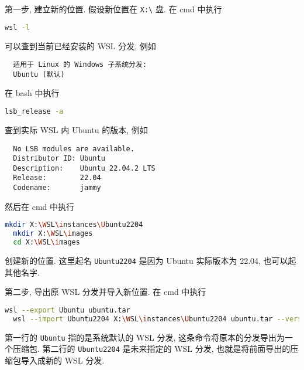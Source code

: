 \documentclass[fontset=founder]{ctexrep}
\begin{document}
第一步,
建立新的位置.
假设新位置在 \texttt{X:\textbackslash} 盘.
在 \textsf{cmd} 中执行
\begin{lstlisting}[language=bash]
  wsl -l
\end{lstlisting}
可以查到当前已经安装的 WSL 分发,
例如
\begin{lstlisting}
  适用于 Linux 的 Windows 子系统分发:
  Ubuntu (默认)
\end{lstlisting}
在 \textsf{bash} 中执行
\begin{lstlisting}[language=bash]
  lsb_release -a
\end{lstlisting}
查到实际 WSL 内 Ubuntu 的版本,
例如
\begin{lstlisting}
  No LSB modules are available.
  Distributor ID: Ubuntu
  Description:    Ubuntu 22.04.2 LTS
  Release:        22.04
  Codename:       jammy
\end{lstlisting}
然后在 \textsf{cmd} 中执行
\begin{lstlisting}[language=bash]
  mkdir X:\WSL\instances\Ubuntu2204
  mkdir X:\WSL\images
  cd X:\WSL\images
\end{lstlisting}
创建新的位置.
这里起名 \texttt{Ubuntu2204} 是因为 Ubuntu 实际版本为 22.04,
也可以起其他名字.

第二步,
导出原 WSL 分发并导入新位置.
在 \textsf{cmd} 中执行
\begin{lstlisting}[language=bash]
  wsl --export Ubuntu ubuntu.tar
  wsl --import Ubuntu2204 X:\WSL\instances\Ubuntu2204 ubuntu.tar --version 2
\end{lstlisting}
第一行的 \texttt{Ubuntu} 指的是系统默认的 WSL 分发,
这条命令将原本的分发导出为一个压缩包.
第二行的 \texttt{Ubuntu2204} 是未来指定的 WSL 分发,
也就是将前面导出的压缩包导入成新的 WSL 分发.
\end{document}

